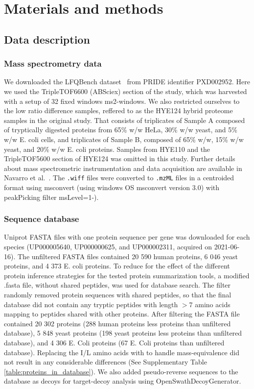 \documentclass[10pt,letterpaper]{article}
\begin{document}
 
\section*{Materials and methods}


\subsection*{Data description}
\subsubsection*{Mass spectrometry data}


We downloaded the LFQBench dataset~\cite{navarro2016multicenter} from PRIDE identifier PXD002952. Here we used the TripleTOF6600 (ABSciex) section of the study, which was harvested with a setup of 32 fixed windows ms2-windows. We also restricted ourselves to the low ratio difference samples, reffered to as the HYE124 hybrid proteome samples in the original study. That consists of triplicates of Sample A composed of tryptically digested proteins from 65\% w/w HeLa, 30\% w/w yeast, and 5\% w/w E. coli cells, and triplicates of Sample B, composed of 65\% w/w, 15\% w/w yeast, and 20\% w/w E. coli proteins. Samples from HYE110 and the TripleTOF5600 section of HYE124 was omitted in this study. Further details about mass spectrometric instrumentation and data acquisition are available in Navarro et al.~\cite{navarro2016multicenter}. The \verb|.wiff| files were converted to \verb|.mzML| files in a centroided format using msconvert (using windows OS msconvert version 3.0) with peakPicking filter msLevel=1-). 


\subsubsection*{Sequence database}

Uniprot FASTA files with one protein sequence per gene was downloaded for each species (UP000005640, UP000000625, and UP000002311, acquired on 2021-06-16). The unfiltered FASTA files contained 20 590 human proteins, 6 046 yeast proteins, and 4 373 E. coli proteins. To reduce for the effect of the different protein inference strategies for the tested protein summarization tools, a modified .fasta file, without shared peptides, was used for database search. The filter randomly removed protein sequences with shared peptides, so that the final database did not contain any tryptic peptides with length $>$7 amino acids mapping to peptides shared with other proteins. After filtering the FASTA file contained 20 302 proteins (288 human proteins less proteins than unfiltered database), 5 848 yeast proteins (198 yeast proteins less proteins than unfiltered database), and 4 306 E. Coli proteins (67 E. Coli proteins than unfiltered database). Replacing the I/L amino acids with to handle mass-equivalence did not result in any considerable differences (See Supplementary Table \ref{table:proteins_in_database}). We also added pseudo-reverse sequences to the database as decoys for target-decoy analysis using OpenSwathDecoyGenerator. 
\end{document}
